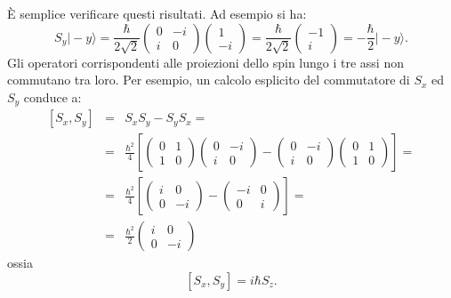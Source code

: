 \documentclass[a4paper,12pt,oneside]{book}
\begin{document}
È semplice verificare questi risultati. Ad esempio si ha:
\begin{equation}
S_y \vert - y \rangle = \frac{\hbar}{2\sqrt{2}}\begin{pmatrix}
0 & -i\\
i & 0
\end{pmatrix}
\begin{pmatrix}
1\\-i
\end{pmatrix} = \frac{\hbar}{2\sqrt{2}} 
\begin{pmatrix}
-1 \\ i
\end{pmatrix} = -\frac{\hbar}{2} \vert -y \rangle .
\end{equation}
Gli operatori corrispondenti alle proiezioni dello spin lungo i tre assi non commutano tra loro. Per esempio, un calcolo esplicito del commutatore di $S_x$ ed $S_y$ conduce a:
\begin{eqnarray}
\left[ S_x , S_y \right] & = & S_x S_y-S_y S_x= \nonumber \\
& = &\frac{\hbar ^2}{4} \left[\begin{pmatrix}
0 & 1\\
1 & 0
\end{pmatrix} \begin{pmatrix}
0 & -i\\
i & 0
\end{pmatrix}- \begin{pmatrix}
0 & -i\\
i & 0
\end{pmatrix}\begin{pmatrix}
0 & 1\\
1 & 0
\end{pmatrix}
\right] = \\
& = &\frac{\hbar ^2}{4} \left[\begin{pmatrix}
i & 0\\
0 & -i
\end{pmatrix} - \begin{pmatrix}
-i & 0\\
0 & i
\end{pmatrix}\right] = \nonumber \\
& = & \frac{\hbar ^2}{2}\begin{pmatrix}
i & 0\\
0 & -i
\end{pmatrix}\nonumber
\end{eqnarray}
ossia
\begin{equation}
\left[ S_x, S_y \right] = i \hbar S_z.
\end{equation}
\end{document}
